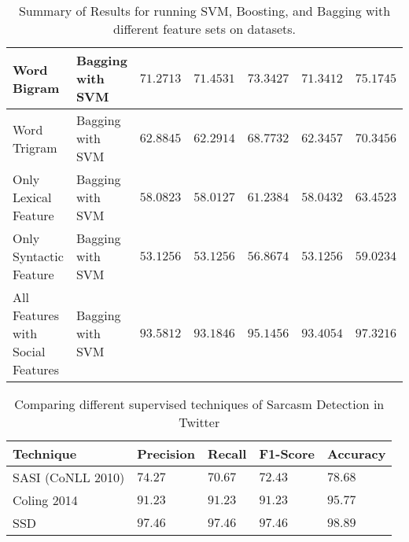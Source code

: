 \begin{table*}[htb]
{\begin{tabular}{|@{~}l@{~~}|@{~~}l@{~}|@{~~}l@{~}|@{~~}l@{~}|@{~~}l@{~}|@{~~}l@{~}|@{~~}l@{~}|}
Word Bigram & Bagging with SVM & $71.2713$ & $71.4531$ & $73.3427$ & $71.3412$  & $75.1745$ \\\hline
Word Trigram & Bagging with SVM & $62.8845$ & $62.2914$ & $68.7732$ & $62.3457$ & $70.3456$ \\\hline
Only Lexical Feature & Bagging with SVM  & $58.0823$ & $58.0127$ & $61.2384$ & $58.0432$  & $63.4523$  \\\hline
Only Syntactic Feature & Bagging with SVM  & $53.1256$ & $53.1256$ & $56.8674$ & $53.1256$  & $59.0234$ \\\hline
All Features with Social Features & Bagging with SVM & $\mathbf{93.5812}$ & $\mathbf{93.1846}$ & $\mathbf{95.1456}$ & $\mathbf{93.4054}$  & $\mathbf{97.3216}$ \\\hline
\end{tabular}
  }
 \vspace{0.05in}
  \caption{Summary of Results for running SVM, Boosting, and Bagging with different feature sets on datasets.}
  \label{tab:data1}
\end{table*}


\begin{table}[htb]
  \centering
  {\small
  \begin{tabular}{|@{~}l@{~~}|@{~~}l@{~}|@{~~}l@{~}|@{~~}l@{~}|@{~~}l@{~}|}
\hline
Technique & Precision & Recall & F1-Score & Accuracy\\\hline
SASI (CoNLL 2010) & $74.27$ & $70.67$ & $72.43$ & $78.68$\\\hline
Coling 2014 & $91.23$ & $91.23$ & $91.23$ & $95.77$\\\hline
SSD & $97.46$ & $97.46$ & $97.46$ & $98.89$\\\hline
\end{tabular}
  }
 \vspace{0.05in}
  \caption{Comparing different supervised techniques of Sarcasm Detection in Twitter}
  \label{tab:data2}
\end{table}


